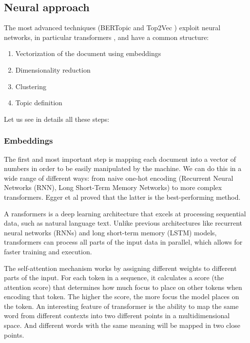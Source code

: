 \subsection{Neural approach}

The most advanced techniques (BERTopic \cite{grootendorst_bertopic_2022}and Top2Vec \cite{angelov_top2vec_2020})  exploit neural networks, in particular transformers \cite{vaswani_attention_2017}, and have a common structure: 

\begin{enumerate}
    \item Vectorization of the document using embeddings
    \item Dimensionality reduction
    \item Clustering
    \item Topic definition
\end{enumerate}

Let us see in details all these steps:

\subsubsection{Embeddings}

The first and most important step is mapping each document into a vector of numbers in order to be easily manipulated by the machine. We can do this in a wide range of different ways: from naive one-hot encoding (Recurrent Neural Networks (RNN), Long Short-Term Memory Networks) to more complex transformers. Egger et al \cite{egger_topic_2022} proved that the latter is the best-performing method.

A ransformers \cite{vaswani_attention_2017}  is a deep learning architecture that excels at processing sequential data, such as natural language text. Unlike previous architectures like recurrent neural networks (RNNs) and long short-term memory (LSTM) models, transformers can process all parts of the input data in parallel, which allows for faster training and execution.

The self-attention mechanism works by assigning different weights to different parts of the input. For each token in a sequence, it calculates a score (the attention score) that determines how much focus to place on other tokens when encoding that token. The higher the score, the more focus the model places on the token. An interesting feature of transformer is the ability to map the same word from different contexts into two different points in a multidimensional space. And different words with the same meaning will be mapped in two close points.

